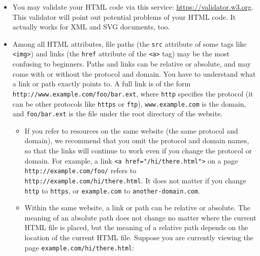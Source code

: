 \documentclass[12pt,]{krantz}
\theoremstyle{definition}
\theoremstyle{definition}
\theoremstyle{definition}
\theoremstyle{remark}
\begin{document}
\begin{itemize}
\item
  You may validate your HTML code via this service:
  \url{https://validator.w3.org}. This validator will point out
  potential problems of your HTML code. It actually works for XML and
  SVG documents, too.
\item
  Among all HTML attributes, file paths (the \texttt{src} attribute of
  some tags like \texttt{\textless{}img\textgreater{}}) and links (the
  \texttt{href} attribute of the \texttt{\textless{}a\textgreater{}}
  tag) may be the most confusing to beginners. Paths and links can be
  relative or absolute, and may come with or without the protocol and
  domain. You have to understand what a link or path exactly points to.
  A full link is of the form
  \texttt{http://www.example.com/foo/bar.ext}, where \texttt{http}
  specifies the protocol (it can be other protocols like \texttt{https}
  or \texttt{ftp}), \texttt{www.example.com} is the domain, and
  \texttt{foo/bar.ext} is the file under the root directory of the
  website.

  \begin{itemize}
  \item
    If you refer to resources on the same website (the same protocol and
    domain), we recommend that you omit the protocol and domain names,
    so that the links will continue to work even if you change the
    protocol or domain. For example, a link
    \texttt{\textless{}a\ href="/hi/there.html"\textgreater{}} on a page
    \texttt{http://example.com/foo/} refers to
    \texttt{http://example.com/hi/there.html}. It does not matter if you
    change \texttt{http} to \texttt{https}, or \texttt{example.com} to
    \texttt{another-domain.com}.
  \item
    Within the same website, a link or path can be relative or absolute.
    The meaning of an absolute path does not change no matter where the
    current HTML file is placed, but the meaning of a relative path
    depends on the location of the current HTML file. Suppose you are
    currently viewing the page \texttt{example.com/hi/there.html}:


\end{itemize}
\end{itemize}
\end{document}
